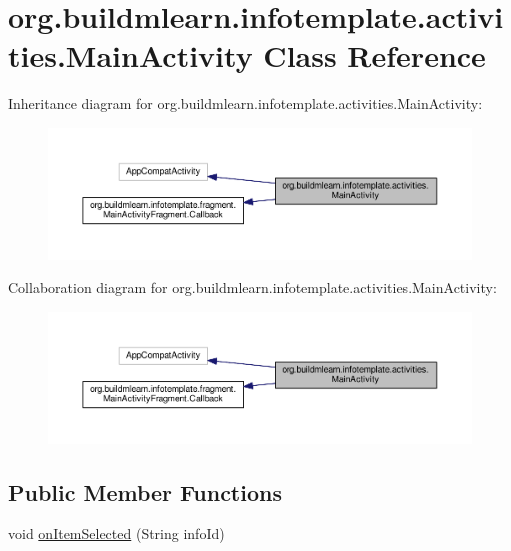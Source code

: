 \hypertarget{classorg_1_1buildmlearn_1_1infotemplate_1_1activities_1_1MainActivity}{}\section{org.\+buildmlearn.\+infotemplate.\+activities.\+Main\+Activity Class Reference}
\label{classorg_1_1buildmlearn_1_1infotemplate_1_1activities_1_1MainActivity}


Inheritance diagram for org.\+buildmlearn.\+infotemplate.\+activities.\+Main\+Activity\+:
\nopagebreak
\begin{figure}[H]
\begin{center}
\leavevmode
\includegraphics[width=350pt]{classorg_1_1buildmlearn_1_1infotemplate_1_1activities_1_1MainActivity__inherit__graph}
\end{center}
\end{figure}


Collaboration diagram for org.\+buildmlearn.\+infotemplate.\+activities.\+Main\+Activity\+:
\nopagebreak
\begin{figure}[H]
\begin{center}
\leavevmode
\includegraphics[width=350pt]{classorg_1_1buildmlearn_1_1infotemplate_1_1activities_1_1MainActivity__coll__graph}
\end{center}
\end{figure}
\subsection*{Public Member Functions}
\begin{DoxyCompactItemize}
\item 
void \hyperlink{classorg_1_1buildmlearn_1_1infotemplate_1_1activities_1_1MainActivity_a603bb5180ac76261e9cbd97e8e973b89}{on\+Item\+Selected} (String info\+Id)
\end{DoxyCompactItemize}
